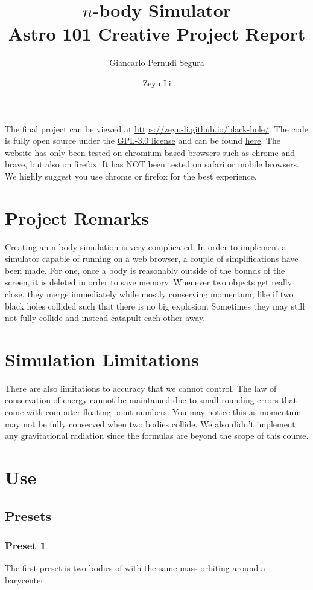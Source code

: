 \documentclass{article}
\title{%
	$n$-body Simulator \\
	\large{Astro 101 Creative Project Report}
}
\author[1]{Giancarlo Pernudi Segura}
\affil{pernudi@ualberta.ca}
\author[2]{Zeyu Li}
\affil{zeyu7@ualberta.ca}
\begin{document}
\maketitle

The final project can be viewed at \url{https://zeyu-li.github.io/black-hole/}. The code is fully open source under the \href{https://raw.githubusercontent.com/Zeyu-Li/black-hole/main/LICENSE}{GPL-3.0 license} and can be found \href{https://github.com/Zeyu-Li/black-hole}{here}. The website has only been tested on chromium based browsers such as chrome and brave, but also on firefox. It has NOT been tested on safari or mobile browsers. We highly suggest you use chrome or firefox for the best experience.

\section{Project Remarks}
Creating an n-body simulation is very complicated. In order to implement a simulator capable of running on a web browser, a couple of simplifications have been made. For one, once a body is reasonably outside of the bounds of the screen, it is deleted in order to save memory. Whenever two objects get really close, they merge immediately while mostly conserving momentum, like if two black holes collided such that there is no big explosion. Sometimes they may still not fully collide and instead catapult each other away.

\section{Simulation Limitations}
There are also limitations to accuracy that we cannot control. The law of conservation of energy cannot be maintained due to small rounding errors that come with computer floating point numbers. You may notice this as momentum may not be fully conserved when two bodies collide. We also didn't implement any gravitational radiation since the formulas are beyond the scope of this course.

\section{Use}
\subsection{Presets}
\subsubsection{Preset 1}
The first preset is two bodies of with the same mass orbiting around a barycenter.
\end{document}
